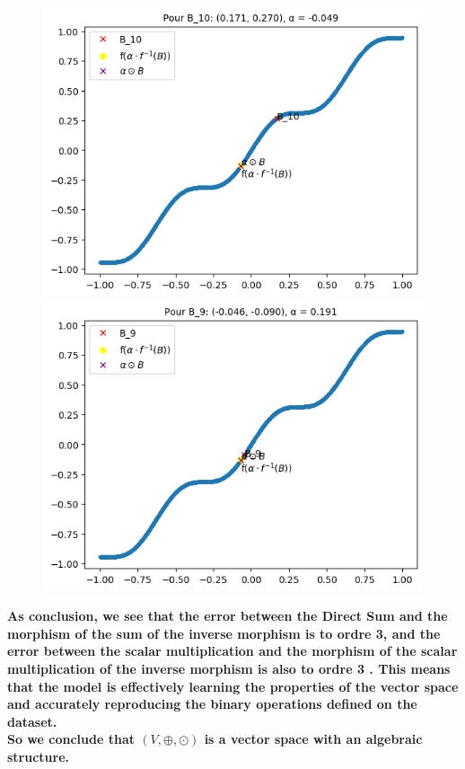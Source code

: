 \documentclass{report}
\begin{document}
            \begin{figure}[h]
                \centering
                \begin{minipage}{0.5\textwidth}
                    \centering
                    \includegraphics[width=0.9\linewidth]{./images/alpha3.png}
                \end{minipage}%
                \begin{minipage}{0.5\textwidth}
                    \centering
                    \includegraphics[width=0.9\linewidth]{./images/alpha4.png}
                \end{minipage}
            \end{figure}

        \textbf{As conclusion, we see that the error between the Direct Sum and the morphism of the sum of the inverse morphism is to ordre 3, and the error between the scalar multiplication and the morphism of the scalar multiplication of the inverse morphism is also to ordre 3 . This means that the model is effectively learning the properties of the vector space and accurately reproducing the binary operations defined on the dataset.\\
        So we conclude that $(V,\oplus,\odot)$ is a vector space with an algebraic structure.}
\end{document}
